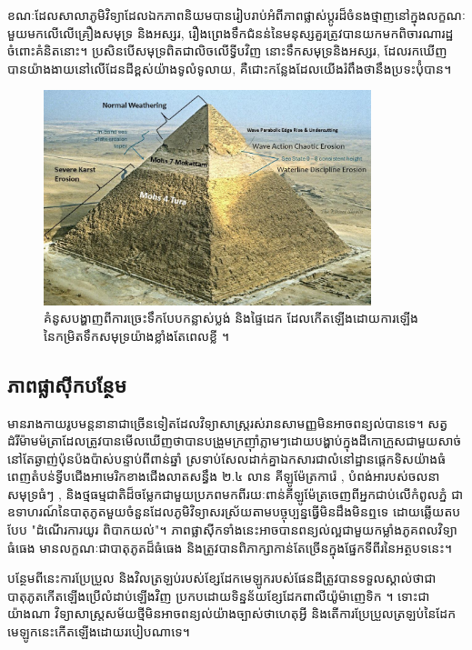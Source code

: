 \documentclass[10pt,twocolumn,letterpaper]{article}
\begin{document}
ខណៈដែលសាលាភូមិវិទ្យាដែលឯកភាពនិយមបានរៀបរាប់អំពីភាពផ្លាស់ប្តូរដ៏ចំនងថ្មាញនៅក្នុងលក្ខណៈមួយមកលើលើគ្រឿងសមុទ្រ និងអស្សរ, រឿងព្រេងទឹកជំនន់នៃមនុស្សគួរត្រូវបានយកមកពិចារណារដ្ឋចំពោះគំនិតនោះ។ ប្រសិនបើសមុទ្រពិតជាលិចលើទ្វីបវិញ នោះទឹកសមុទ្រនិងអស្សរ, ដែលរកឃើញបានយ៉ាងងាយនៅលើដែនដីខ្ពស់យ៉ាងទូលំទូលាយ, គឺជោះកន្លែងដែលយើងរំពឹងថានឹងប្រទះប៉ុំបាន។

\begin{figure}[t]
\begin{center}
\includegraphics[width=0.85\textwidth]{khafre.jpg}
\end{center}
   \caption{គំនូសបង្ហាញពីការច្រេះទឹកបែបកន្លាស់ប្លង់ និងផ្ទៃដេក ដែលកើតឡើងដោយការឡើងនៃកម្រិតទឹកសមុទ្រយ៉ាងខ្លាំងតែពេលខ្លី \cite{27}។}
\label{fig:4}
\end{figure}

\subsection{ភាពផ្លាស៊ីកបន្ថែម}

មានរាងកាយរូបមន្តនានាជាច្រើនទៀតដែលវិទ្យាសាស្ត្ររស់រានសាមញ្ញមិនអាចពន្យល់បានទេ។ សត្វដំរីម៉ាមម៉ត្រាដែលត្រូវបានមើលឃើញថាបានបង្រួមក្រញ៉ាំភ្លាមៗដោយបង្ហាប់ក្នុងដីកោក្រួសជាមួយសាច់នៅតែឆ្ងាញ់ប៉ុនប៉ងប៉ាស់បន្ទាប់ពីពាន់ឆ្នាំ \cite{17,18,19} ស្រទាប់សែលដាក់គ្នាឯកសារជាលំនៅដ្ឋានផ្តេកទិសយ៉ាងធំពេញតំបន់ទ្វីបជើងអាមេរិកខាងជើងលាតសន្ធឹង ២.៤ លាន គីឡូម៉ែត្រការ៉េ \cite{21}, បំពង់អារបស់ចលនាសមុទ្រធំៗ \cite{22}, និងថ្មធម្មជាតិដ៏ចម្លែកជាមួយប្រភពមកពីរយៈពាន់គីឡូម៉ែត្រចេញពីអ្នកជាប់លើកំពូលភ្នំ \cite{23,26} ជាឧទាហរណ៍នៃបាតុភូតមួយចំនួនដែលភូមិវិទ្យាសរស្រ័យតាមបច្ចុប្បន្នធ្វើមិនដឹងមិនឮទេ ដោយឆ្លើយតបបែប "ដំណើរការយូរ ពិបាកយល់"។ ភាពផ្លាស៊ីកទាំងនេះអាចបានពន្យល់ល្អជាមួយកម្លាំងភូគពលវិទ្យាធំធេង មានលក្ខណៈជាបាតុភូតដ៏ធំធេង និងត្រូវបានពិភាក្សាកាន់តែច្រើនក្នុងផ្នែកទីពីរនៃអត្ថបទនេះ។

បន្ថែមពីនេះការប្រែប្រួល និងវិលត្រឡប់របស់ខ្សែដែកមេឡូករបស់ផែនដីត្រូវបានទទួលស្គាល់ថាជាបាតុភូតកើតឡើងប្រេីលំដាប់ឡើងវិញ ប្រកបដោយទិន្នន័យខ្សែដែកពាលីយ៉ូម៉ាញេទិក \cite{35,40,41}។ ទោះជាយ៉ាងណា វិទ្យាសាស្ត្រសម័យថ្មីមិនអាចពន្យល់យ៉ាងច្បាស់ថាហេតុអ្វី និងតើការប្រែប្រួលត្រឡប់នៃដែកមេឡូកនេះកើតឡើងដោយរបៀបណាទេ។
\end{document}

